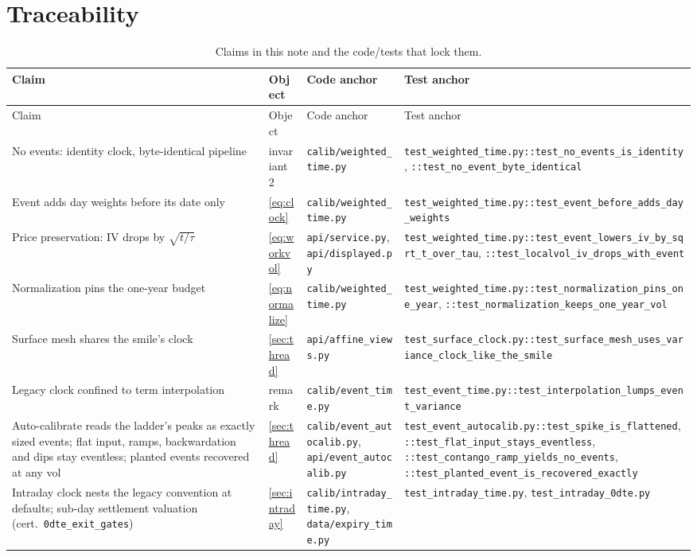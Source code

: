 \documentclass[11pt]{article}
\begin{document}
\section{Traceability}
\label{sec:traceability}

\begingroup
\small
\setlength{\tabcolsep}{3pt}
\begin{longtable}{@{}p{}p{}p{}p{}@{}}
\caption{Claims in this note and the code/tests that lock them.}\\
\toprule Claim & Object & Code anchor & Test anchor\\ \midrule
\endfirsthead
\toprule Claim & Object & Code anchor & Test anchor\\ \midrule
\endhead
No events: identity clock, byte-identical pipeline &
invariant~2 &
\nolinkurl{calib/weighted_time.py} &
\nolinkurl{test_weighted_time.py::test_no_events_is_identity}, \nolinkurl{::test_no_event_byte_identical}\\
Event adds day weights before its date only &
\eqref{eq:clock} &
\nolinkurl{calib/weighted_time.py} &
\nolinkurl{test_weighted_time.py::test_event_before_adds_day_weights}\\
Price preservation: IV drops by $\sqrt{t/\tau}$ &
\eqref{eq:workvol} &
\nolinkurl{api/service.py}, \nolinkurl{api/displayed.py} &
\nolinkurl{test_weighted_time.py::test_event_lowers_iv_by_sqrt_t_over_tau}, \nolinkurl{::test_localvol_iv_drops_with_event}\\
Normalization pins the one-year budget &
\eqref{eq:normalize} &
\nolinkurl{calib/weighted_time.py} &
\nolinkurl{test_weighted_time.py::test_normalization_pins_one_year}, \nolinkurl{::test_normalization_keeps_one_year_vol}\\
Surface mesh shares the smile's clock &
\cref{sec:thread} &
\nolinkurl{api/affine_views.py} &
\nolinkurl{test_surface_clock.py::test_surface_mesh_uses_variance_clock_like_the_smile}\\
Legacy clock confined to term interpolation &
remark &
\nolinkurl{calib/event_time.py} &
\nolinkurl{test_event_time.py::test_interpolation_lumps_event_variance}\\
Auto-calibrate reads the ladder's peaks as exactly sized events; flat
input, ramps, backwardation and dips stay eventless; planted events
recovered at any vol &
\cref{sec:thread} &
\nolinkurl{calib/event_autocalib.py}, \nolinkurl{api/event_autocalib.py} &
\nolinkurl{test_event_autocalib.py::test_spike_is_flattened}, \nolinkurl{::test_flat_input_stays_eventless}, \nolinkurl{::test_contango_ramp_yields_no_events}, \nolinkurl{::test_planted_event_is_recovered_exactly}\\
\addlinespace
Intraday clock nests the legacy convention at defaults; sub-day settlement
valuation (cert.\ \texttt{0dte\_exit\_gates}) &
\cref{sec:intraday} &
\nolinkurl{calib/intraday_time.py}, \nolinkurl{data/expiry_time.py} &
\nolinkurl{test_intraday_time.py}, \nolinkurl{test_intraday_0dte.py}\\
\bottomrule
\end{longtable}
\endgroup
\end{document}
